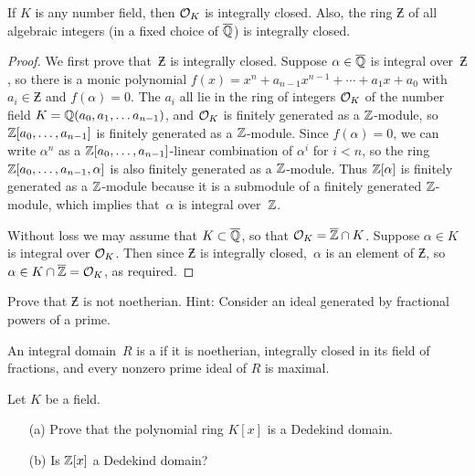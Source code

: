 \begin{proposition}\label{prop:integrallyclosed}
If $K$ is any number field, then $\mathcal{O}_K$ is integrally closed.  Also,
the ring $\Zbar$ of all algebraic integers (in a fixed choice of $\overline{\mathbb{Q}}$)
is integrally closed.
\end{proposition}
\begin{proof}
We first prove that~$\Zbar$ is integrally closed.  Suppose $\alpha\in\overline{\mathbb{Q}}$
is integral over~$\Zbar$, so there is a monic polynomial $f(x)=x^n +
a_{n-1}x^{n-1} + \cdots + a_1 x + a_0$ with $a_i\in\Zbar$ and
$f(\alpha)=0$.  The $a_i$ all lie in the ring of integers $\mathcal{O}_K$ of the
number field $K=\mathbb{Q}(a_0,a_1,\ldots a_{n-1})$, and $\mathcal{O}_K$ is finitely
generated as a $\mathbb{Z}$-module, so $\mathbb{Z}[a_0,\ldots, a_{n-1}]$ is finitely
generated as a $\mathbb{Z}$-module.  Since $f(\alpha)=0$, we can write $\alpha^n$ as a
$\mathbb{Z}[a_0,\ldots, a_{n-1}]$-linear combination of $\alpha^i$ for $i<n$, so
the ring $\mathbb{Z}[a_0,\ldots, a_{n-1},\alpha]$ is also finitely generated as a
$\mathbb{Z}$-module.  Thus $\mathbb{Z}[\alpha]$ is finitely generated as a $\mathbb{Z}$-module
because it is a submodule of a finitely generated $\mathbb{Z}$-module, which
implies that~$\alpha$ is integral over~$\mathbb{Z}$.

Without loss we may assume that $K\subset \overline{\mathbb{Q}}$, so that
$\mathcal{O}_K = \overline{\mathbb{Z}} \cap K$.
Suppose $\alpha\in K$ is integral over $\mathcal{O}_K$.  Then since $\Zbar$ is
integrally closed,~$\alpha$ is an element of $\Zbar$, so
$\alpha\in K \cap \overline{\mathbb{Z}}=\mathcal{O}_K$, as required.
\end{proof}

\begin{exercise}\label{ex:Zbarnotnoetherian}
	Prove that $\Zbar$ is not noetherian. Hint: Consider an ideal
	generated by fractional powers of a prime.
\end{exercise}

\begin{definition}
An integral domain~$R$ is a  if it is noetherian,
integrally closed in its field of fractions, and every nonzero prime
ideal of $R$ is maximal.
\end{definition}

\begin{exercise}
Let $K$ be a field.
\begin{enumerate}
\item[(a)] Prove that the polynomial ring $K[x]$ is a Dedekind domain.
\item[(b)] Is $\mathbb{Z}[x]$ a Dedekind domain?
\end{enumerate}
\end{exercise}

